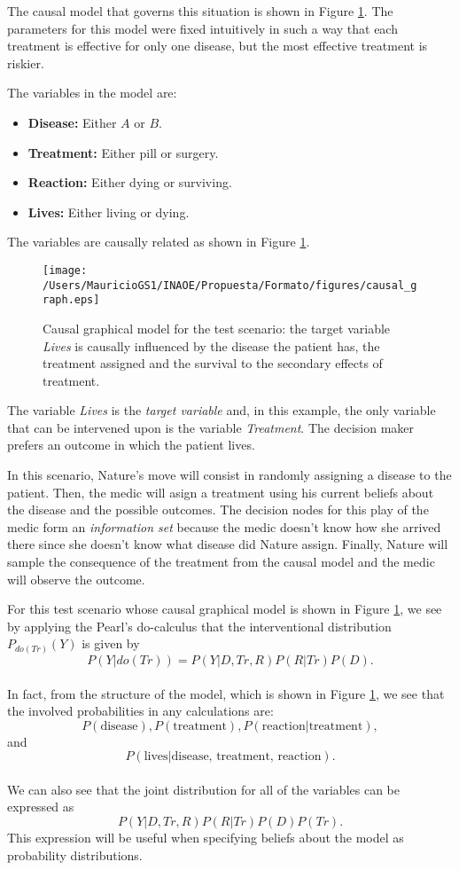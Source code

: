 \documentclass[english,letterpaper,12pt,final]{article}
\theoremstyle{definition}
\begin{document}
The causal model that governs this situation is shown in Figure \ref{causal_model}. The parameters for this model were fixed intuitively in such a way that each treatment is effective for only one disease, but the most effective treatment is riskier.

The variables in the model are: 
\begin{itemize}
\item \textbf{Disease:} Either $A$ or $B$.
\item \textbf{Treatment:} Either pill or surgery.
\item \textbf{Reaction:} Either dying or surviving.
\item \textbf{Lives:} Either living or dying.
\end{itemize}

The variables are causally related as shown in Figure \ref{causal_model}.

\begin{figure}[ht]
\vskip 0.2in
\begin{center}
\centerline{\texttt{[image: /Users/MauricioGS1/INAOE/Propuesta/Formato/figures/causal\_graph.eps]}}
\caption{Causal graphical model for the test scenario: the target variable \textit{Lives} is causally influenced by the disease the patient has, the treatment assigned and the survival to the secondary effects of treatment.}
\label{causal_model}
\end{center}
\vskip -0.2in
\end{figure}

The variable \textit{Lives} is the \textit{target variable} and, in this example, the only variable that can be intervened upon is the variable \textit{Treatment}. The decision maker prefers an outcome in which the patient lives.

In this scenario, Nature's move will consist in randomly assigning a disease to the patient. Then, the medic will asign a treatment using his current beliefs about the disease and the possible outcomes. The decision nodes for this play of the medic form an \textit{information set} because the medic doesn't know how she arrived there since she doesn't know what disease did Nature assign. Finally, Nature will sample the consequence of the treatment from the causal model and the medic will observe the outcome.

For this test scenario whose causal graphical model is shown in Figure \ref{causal_model}, we see  by applying the Pearl's do-calculus that the interventional distribution $P_{do(Tr)}(Y)$ is given by
\[ P(Y | do(Tr))=P(Y | D, Tr, R)P(R | Tr) P(D). \]
\\
In fact, from the structure of the model, which is shown in Figure \ref{causal_model}, we see that the involved probabilities in any calculations are:
\[ P(\textrm{disease}), P(\textrm{treatment}), P(\textrm{reaction} | \textrm{treatment}), \]
and
\[P(\textrm{lives} | \textrm{disease, treatment, reaction}). \]
\\
We can also see that the joint distribution for all of the variables can be expressed as
\[ P(Y | D, Tr, R)P(R | Tr) P(D)P(Tr). \]
This expression will be useful when specifying beliefs about the model as probability distributions.
\end{document}
